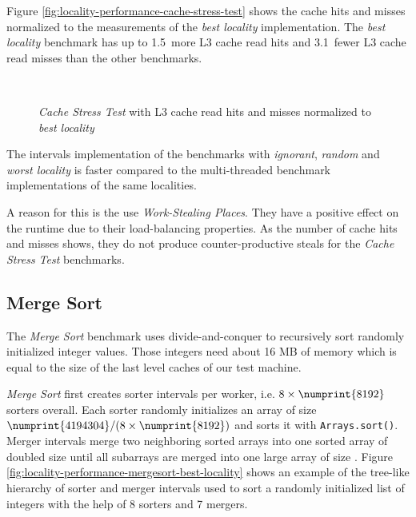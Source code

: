 Figure \ref{fig:locality-performance-cache-stress-test} shows the
cache hits and misses normalized to the measurements of the \emph{best
  locality} implementation. The \emph{best locality} benchmark has up
to 1.5\texttimes\ more L3 cache read hits and 3.1\texttimes\ fewer L3
cache read misses than the other benchmarks.

\begin{figure}[!ht]
  \centering
  \\
  \caption[\emph{Cache Stress Test} L3 cache read hits and
  misses]{\emph{Cache Stress Test} with L3 cache read hits and misses
    normalized to \emph{best locality}}
  \label{fig:locality-performance-cache-stress-test-cache}
\end{figure}

The intervals implementation of the benchmarks with \emph{ignorant},
\emph{random} and \emph{worst locality} is faster compared to the
multi-threaded benchmark implementations of the same
localities. 

A reason for this is the use \emph{Work-Stealing Places}. They have a
positive effect on the runtime due to their load-balancing
properties. As the number of cache hits and misses shows, they do not
produce counter-productive steals for the \emph{Cache Stress Test}
benchmarks.

\subsection{Merge Sort}
\label{sec:locality-performance-merge-sort}

The \emph{Merge Sort} benchmark uses divide-and-conquer to recursively
sort  randomly initialized integer values. Those
integers need about 16 MB of memory which is equal to the size of the
last level caches of our test machine.

\emph{Merge Sort} first creates  sorter intervals per
worker, i.e. $8 \times \numprint{8192}$ sorters overall. Each sorter
randomly initializes an array of size $\numprint{4194304} / (8 \times
\numprint{8192})$ and sorts it with \lstinline!Arrays.sort()!. Merger
intervals merge two neighboring sorted arrays into one sorted array of
doubled size until all subarrays are merged into one large array of
size . Figure
\ref{fig:locality-performance-mergesort-best-locality} shows an
example of the tree-like hierarchy of sorter and merger intervals used
to sort a randomly initialized list of integers with the help of 8
sorters and 7 mergers.

